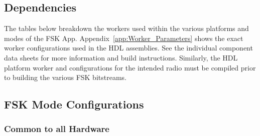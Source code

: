 \subsection{Dependencies}
\noindent The tables below breakdown the workers used within the various platforms and modes of the FSK App. Appendix~\ref{app:Worker_Parameters} shows the exact worker configurations used in the HDL assemblies. See the individual component data sheets for more information and build instructions. Similarly, the HDL platform worker and configurations for the intended radio must be compiled prior to building the various FSK bitstreams.
\subsection{FSK Mode Configurations}
\subsubsection{Common to all Hardware}
